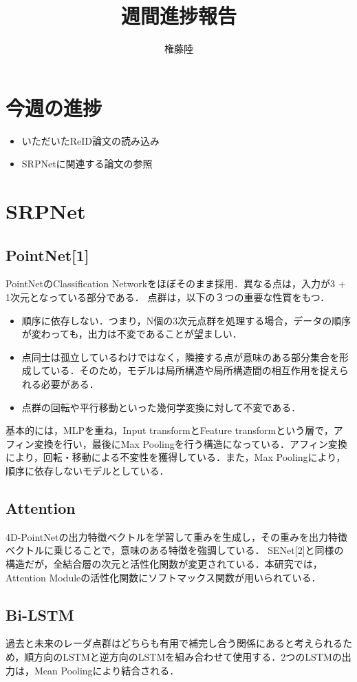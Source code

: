 \documentclass[dvipdfmx]{jsarticle}
\begin{document}
\title{週間進捗報告}
\author{権藤陸}
\maketitle
\section{今週の進捗}
\begin{itemize}
    \item いただいたReID論文の読み込み
    \item SRPNetに関連する論文の参照
\end{itemize}

\section{SRPNet}
\subsection{PointNet[1]}
PointNetのClassification Networkをほぼそのまま採用．異なる点は，入力が3 + 1次元となっている部分である．
点群は，以下の３つの重要な性質をもつ．
\begin{itemize}
    \item 順序に依存しない．つまり，N個の3次元点群を処理する場合，データの順序が変わっても，出力は不変であることが望ましい．
    \item 点同士は孤立しているわけではなく，隣接する点が意味のある部分集合を形成している．そのため，モデルは局所構造や局所構造間の相互作用を捉えられる必要がある．
    \item 点群の回転や平行移動といった幾何学変換に対して不変である．
\end{itemize}
基本的には，MLPを重ね，Input transformとFeature transformという層で，アフィン変換を行い，最後にMax Poolingを行う構造になっている．アフィン変換により，回転・移動による不変性を獲得している．また，Max Poolingにより，順序に依存しないモデルとしている．

\subsection{Attention}
4D-PointNetの出力特徴ベクトルを学習して重みを生成し，その重みを出力特徴ベクトルに乗じることで，意味のある特徴を強調している．
SENet[2]と同様の構造だが，全結合層の次元と活性化関数が変更されている．本研究では，Attention Moduleの活性化関数にソフトマックス関数が用いられている．
\subsection{Bi-LSTM}
過去と未来のレーダ点群はどちらも有用で補完し合う関係にあると考えられるため，順方向のLSTMと逆方向のLSTMを組み合わせて使用する．2つのLSTMの出力は，Mean Poolingにより結合される．
\end{document}
